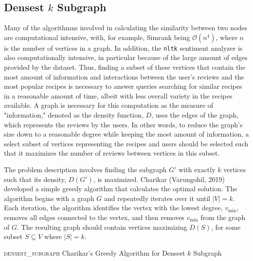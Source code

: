 \documentclass[fontsize=11pt]{article}
\begin{document}
\subsection{Densest $k$ Subgraph}
Many of the algorithmns involved in calculating the similarity between two nodes are computational intensive, with, for example, Simrank being $\mathcal{O}(n^4)$, where $n$ is the number of vertices in a graph. In addition, the \texttt{nltk} sentiment analyzer is also computationally intensive, in particular because of the large amount of edges provided by the dataset. Thus, finding a subset of these vertices that contain the most amount of information and interactions between the user's reviews and the most popular recipes is necessary to answer queries searching for similar recipes in a reasonable amount of time, albeit with less overall variety in the recipes available. A graph is necessary for this computation as the measure of "information," denoted as the density function, $D$, uses the edges of the graph, which represents the reviews by the users. In other words, to reduce the graph's size down to a reasonable degree while keeping the most amount of information, a select subset of vertices representing the recipes and users should be selected such that it maximizes the number of reviews between vertices in this subset. 

The problem description involves finding the subgraph $G'$ with exactly $k$ vertices such that its density, $D(G')$, is maximized. Charikar (Varungohil, 2019) developed a simple greedy algorithm that calculates the optimal solution. The algorithm begins with a graph $G$ and repeatedly iterates over it until $\lvert V \rvert = k$. Each iteration, the algorithm identifies the vertex with the lowest degree, $v_{\text{min}}$, removes all edges connected to the vertex, and then removes $v_{\text{min}}$ from the graph of $G$. The resulting graph should contain vertices maximizing $D(S)$, for some subset $S \subseteq V$ where $\lvert S \rvert = k$.

\begin{algorithm}[H]
    \setcounter{AlgoLine}{0}
    \caption{\textsc{densest\_subgraph} Charikar's Greedy Algorithm for Densest $k$ Subgraph}
\end{algorithm}
\end{document}

